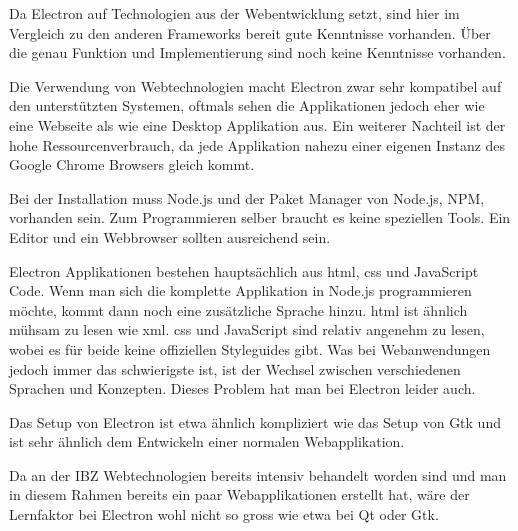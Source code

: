 Da Electron auf Technologien aus der Webentwicklung setzt, sind hier im
Vergleich zu den anderen Frameworks bereit gute Kenntnisse vorhanden. Über die
genau Funktion und Implementierung sind noch keine Kenntnisse vorhanden.

Die Verwendung von Webtechnologien macht Electron zwar sehr kompatibel auf den
unterstützten Systemen, oftmals sehen die Applikationen jedoch eher wie
eine Webseite als wie eine Desktop Applikation aus. Ein weiterer Nachteil ist
der hohe Ressourcenverbrauch, da jede Applikation nahezu einer eigenen Instanz
des Google Chrome Browsers gleich kommt.

Bei der Installation muss Node.js und der Paket Manager von Node.js, NPM,
vorhanden sein. Zum Programmieren selber braucht es keine speziellen Tools. Ein
Editor und ein Webbrowser sollten ausreichend sein.

Electron Applikationen bestehen hauptsächlich aus \gls{html}, \gls{css} und JavaScript
Code. Wenn man sich die komplette Applikation in Node.js programmieren möchte,
kommt dann noch eine zusätzliche Sprache hinzu. \gls{html} ist ähnlich mühsam zu
lesen wie \gls{xml}. \gls{css} und JavaScript sind relativ angenehm zu lesen, wobei es für
beide keine offiziellen Styleguides gibt. Was bei Webanwendungen jedoch immer
das schwierigste ist, ist der Wechsel zwischen verschiedenen Sprachen und
Konzepten. Dieses Problem hat man bei Electron leider auch.

Das Setup von Electron ist etwa ähnlich kompliziert wie das Setup von Gtk und
ist sehr ähnlich dem Entwickeln einer normalen Webapplikation.

Da an der IBZ Webtechnologien bereits intensiv behandelt worden sind und man in
diesem Rahmen bereits ein paar Webapplikationen erstellt hat, wäre der
Lernfaktor bei Electron wohl nicht so gross wie etwa bei Qt oder Gtk.

